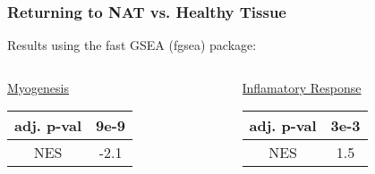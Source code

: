 \documentclass[11pt,t]{beamer}
\begin{document}
\begin{frame}
  \frametitle{Returning to NAT vs. Healthy Tissue}
  
  Results using the fast GSEA (fgsea) package:
  \begin{columns}
    \begin{column}{0.5\textwidth}
      \begin{center}
        \underline{Myogenesis}
        
        \begin{tabular}{ |c|c| } 
        \hline
        adj. p-val & \textbf{9e-9} \\
        \hline
        NES & -2.1 \\
        \hline
        \end{tabular}
      \end{center}
    \end{column}
    \vrule{}
    \begin{column}{0.5\textwidth}  %
      \begin{center}
        \underline{Inflamatory Response}
        
        \begin{tabular}{ |c|c| } 
        \hline
        adj. p-val & \textbf{3e-3} \\
        \hline
        NES & 1.5 \\
        \hline
        \end{tabular}
      \end{center}
    \end{column}
   \end{columns}


\end{frame}
\end{document}
